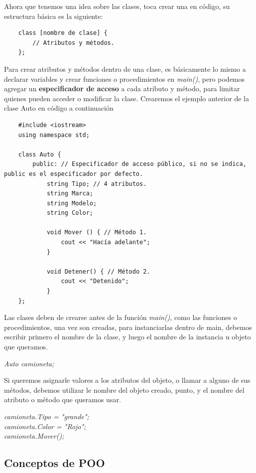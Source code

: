 Ahora que tenemos una idea sobre las clases, toca crear una en código, su estructura básica es la siguiente:
\begin{lstlisting}
    class [nombre de clase] {
        // Atributos y métodos.
    };
\end{lstlisting}

Para crear atributos y métodos dentro de una clase, es básicamente lo mismo a declarar variables y crear funciones o procedimientos en \textit{main()}, pero podemos agregar un \textbf{especificador de acceso} a cada atributo y método, para limitar quienes pueden acceder o modificar la clase. Crearemos el ejemplo anterior de la clase Auto en código a continuación
\begin{lstlisting}
    #include <iostream>
    using namespace std;

    class Auto {
        public: // Especificador de acceso público, si no se indica, public es el especificador por defecto.
            string Tipo; // 4 atributos.
            string Marca;
            string Modelo;
            string Color;
            
            void Mover () { // Método 1.
                cout << "Hacía adelante";
            }
            
            void Detener() { // Método 2.
                cout << "Detenido";
            }
    };
\end{lstlisting}

Las clases deben de crearse antes de la función \textit{main()}, como las funciones o procedimientos, una vez son creadas, para instanciarlas dentro de main, debemos escribir primero el nombre de la clase, y luego el nombre de la instancia u objeto que queramos.
\begin{center}
	\textit{Auto camioneta;}
\end{center}

Si queremos asignarle valores a los atributos del objeto, o llamar a alguno de sus métodos, debemos utilizar le nombre del objeto creado, punto, y el nombre del atributo o método que queramos usar.
\begin{center}
	\textit{
		camioneta.Tipo = "grande"; \\
		camioneta.Color = "Rojo"; \\
		camioneta.Mover();
	}
\end{center}


\subsection{Conceptos de POO}


